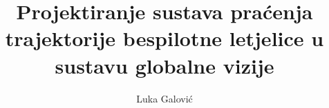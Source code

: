 \documentclass[times, utf8, diplomski]{fer}
\begin{document}

\title{Projektiranje sustava praćenja trajektorije bespilotne letjelice u sustavu globalne vizije}

\author{Luka Galović}

\maketitle

\izvornik


\tableofcontents
\end{document}

